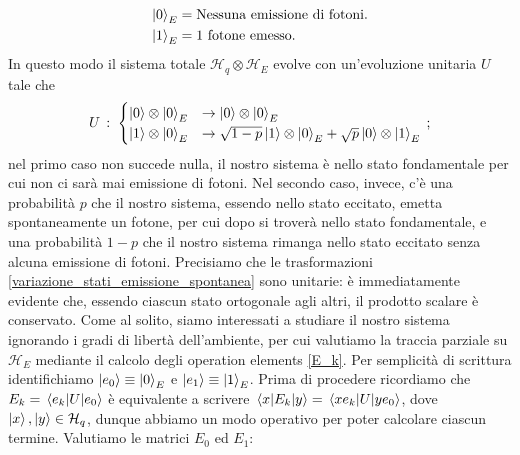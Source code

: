 \begin{align*}
    \ket{0}_E &= \text{Nessuna emissione di fotoni}. \\
    \ket{1}_E &= \text{1 fotone emesso}. 
\end{align*}
In questo modo il sistema totale $\mathcal{H}_q \otimes \mathcal{H}_E$ evolve con un'evoluzione unitaria $U$ tale che
\begin{equation}\label{variazione_stati_emissione_spontanea}
    U \, : \; 
    \begin{cases}
        \ket{0} \otimes \ket{0}_E &\rightarrow  \ket{0} \otimes \ket{0}_E \\
        \ket{1} \otimes \ket{0}_E &\rightarrow  \sqrt{1-p} \ket{1} \otimes \ket{0}_E + \sqrt{p} \ket{0} \otimes \ket{1}_E
    \end{cases} \, ;
\end{equation}
nel primo caso non succede nulla, il nostro sistema è nello stato fondamentale per cui non ci sarà mai emissione di fotoni. Nel secondo caso, invece, c'è una probabilità $p$ che il nostro sistema, essendo nello stato eccitato, emetta spontaneamente un fotone, per cui dopo si troverà nello stato fondamentale, e una probabilità $1-p$ che il nostro sistema rimanga nello stato eccitato senza alcuna emissione di fotoni. Precisiamo che le trasformazioni \eqref{variazione_stati_emissione_spontanea} sono unitarie: è immediatamente evidente che, essendo ciascun stato ortogonale agli altri, il prodotto scalare è conservato. Come al solito, siamo interessati a studiare il nostro sistema ignorando i gradi di libertà dell'ambiente, per cui valutiamo la traccia parziale su $\mathcal{H}_E$ mediante il calcolo degli operation elements \eqref{E_k}. Per semplicità di scrittura identifichiamo $\ket{e_0} \equiv \ket{0}_E$ e $\ket{e_1} \equiv \ket{1}_E$. Prima di procedere ricordiamo che $E_k=\mel{e_k}{U}{e_0}$ è equivalente a scrivere $\mel{x}{E_k}{y}=\mel{xe_k}{U}{ye_0}$, dove $\ket x , \ket y \in \mathcal{H}_q$, dunque abbiamo un modo operativo per poter calcolare ciascun termine. Valutiamo le matrici $E_0$ ed $E_1$:
